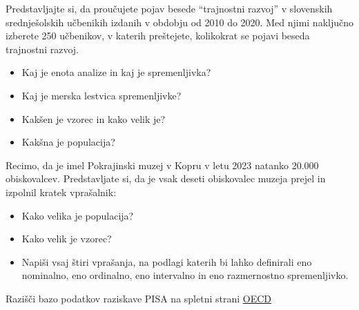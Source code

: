 \begin{Vaje}{3}
        Predstavljajte si, da proučujete pojav besede “trajnostni razvoj” v slovenskih srednješolskih učbenikih izdanih v obdobju od 2010 do 2020. Med njimi naključno izberete 250 učbenikov, v katerih preštejete, kolikokrat se pojavi beseda trajnostni razvoj.
        \begin{itemize}
            \item Kaj je enota analize in kaj je spremenljivka?
            \item Kaj je merska lestvica spremenljivke?
            \item Kakšen je vzorec in kako velik je?
            \item Kakšna je populacija?
        \end{itemize}
\end{Vaje}

\begin{Vaje}{4}
        Recimo, da je imel Pokrajinski muzej v Kopru v letu 2023 natanko 20.000 obiskovalcev. Predstavljate si, da je vsak deseti obiskovalec muzeja prejel in izpolnil kratek vprašalnik:
        \begin{itemize}
            \item Kako velika je populacija?
            \item Kako velik je vzorec?
            \item Napiši vsaj štiri vprašanja, na podlagi katerih bi lahko definirali eno nominalno, eno ordinalno, eno intervalno in eno razmernostno spremenljivko. 
        \end{itemize}
\end{Vaje}

\begin{Vaje}{5}
        Razišči bazo podatkov raziskave PISA na spletni strani \href{https://www.oecd.org/pisa/data/2022database/}{OECD}
\end{Vaje}